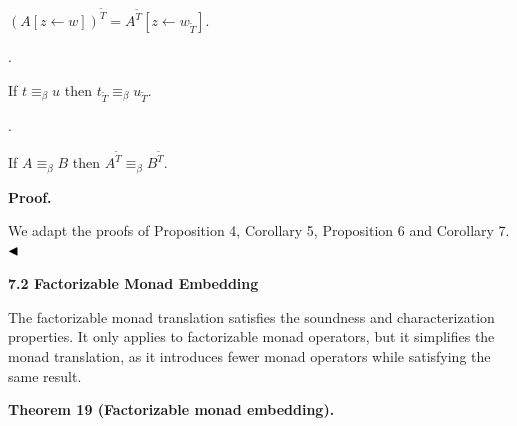 $(A[z\leftarrow w])^{\widetilde{T}}=A^{\widetilde{T}}[z\leftarrow w_{\widetilde{T}}]$.\par
 
 
 
\par{}. 
 
If $t\equiv_{\beta}u$ then $t_{\widetilde{T}}\equiv_{\beta}u_{\widetilde{T}}$.\par
 
 
 
\par{}. 
 
If $A\equiv_{\beta}B$ then $A^{\widetilde{T}}\equiv_{\beta}B^{\widetilde{T}}$.\par
 
 
  
 
 
 
\par\medskip\noindent\textbf{Proof.}\par
 
 
We adapt the proofs of Proposition 4, Corollary 5, Proposition 6 and Corollary 7. $\hfill\blacktriangleleft$\par
 
 
 
 
 
\par\medskip\noindent\textbf{7.2 Factorizable Monad Embedding}\par
 
 
The factorizable monad translation satisfies the soundness and characterization properties. It only applies to factorizable monad operators, but it simplifies the monad translation, as it introduces fewer monad operators while satisfying the same result.\par
 
 
 
\par\medskip\noindent\textbf{Theorem 19 (Factorizable monad embedding).}\par
 
